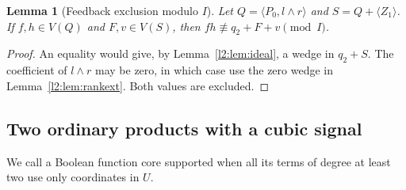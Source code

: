 \documentclass[11pt,a4paper]{article}
\theoremstyle{plain}
\newtheorem{lemma}[theorem]{Lemma}
\theoremstyle{remark}
\theoremstyle{plain}
\begin{document}
\begin{lemma}[Feedback exclusion modulo $I$]\label{toolkit:modfeedback}
Let $Q=\langle P_0,l\wedge r\rangle$ and $S=Q+\langle Z_1\rangle$. If $f,h\in V(Q)$ and $F,v\in V(S)$, then $fh\not\equiv q_2+F+v\pmod I$.
\end{lemma}
\begin{proof}
An equality would give, by Lemma~\ref{l2:lem:ideal}, a wedge in $q_2+S$. The coefficient of $l\wedge r$ may be zero, in which case use the zero wedge in Lemma~\ref{l2:lem:rankext}. Both values are excluded.
\end{proof}

\subsection{Two ordinary products with a cubic signal}
We call a Boolean function core supported when all its terms of degree at least two use only coordinates in $U$.
\end{document}
